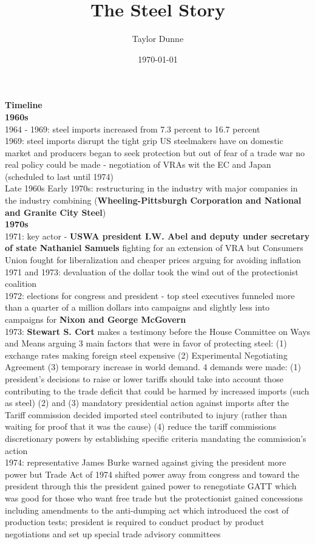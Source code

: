 \documentclass[10pt]{article}
\begin{document}
\title{\vskip-0.6in The Steel Story}
\author{Taylor Dunne}
\date{\today}

\large\textbf{Timeline}\\
\normalsize\textbf{1960s}\\
\normalsize 1964 - 1969: steel imports increased from 7.3 percent to 16.7 percent\\
1969: steel imports disrupt the tight grip US steelmakers have on domestic market and producers began to seek protection but out of fear of a trade war no real policy could be made - negotiation of VRAs wit the EC and Japan (scheduled to last until 1974)\\
Late 1960s Early 1970s: restructuring in the industry with major companies in the industry combining (\textbf{Wheeling-Pittsburgh Corporation and National and Granite City Steel})\\
\normalsize\textbf{1970s}\\
1971: key actor - \textbf{USWA president I.W. Abel and deputy under secretary of state Nathaniel Samuels} fighting for an extension of VRA but Consumers Union fought for liberalization and cheaper prices arguing for avoiding inflation\\
1971 and 1973: devaluation of the dollar took the wind out of the protectionist coalition\\  
1972: elections for congress and president - top steel executives funneled more than a quarter of a million dollars into campaigns and slightly less into campaigns for \textbf{Nixon and George McGovern}\\
1973: \textbf{Stewart S. Cort} makes a testimony before the House Committee on Ways and Means arguing 3 main factors that were in favor of protecting steel: (1) exchange rates making foreign steel expensive (2) Experimental Negotiating Agreement (3) temporary increase in world demand. 4 demands were made: (1) president’s decisions to raise or lower tariffs should take into account those contributing to the trade deficit that could be harmed by increased imports (such as steel) (2) and (3) mandatory presidential action against imports after the Tariff commission decided imported steel contributed to injury (rather than waiting for proof that it was the cause) (4) reduce the tariff commissions discretionary powers by establishing specific criteria mandating the commission's action\\
1974: representative James Burke warned against giving the president more power but Trade Act of 1974 shifted power away from congress and toward the president through this the president gained power to renegotiate GATT which was good for those who want free trade but the protectionist gained concessions including amendments to the anti-dumping act which introduced the cost of production tests; president is required to conduct product by product negotiations and set up special trade advisory committees\\ 
\end{document}
